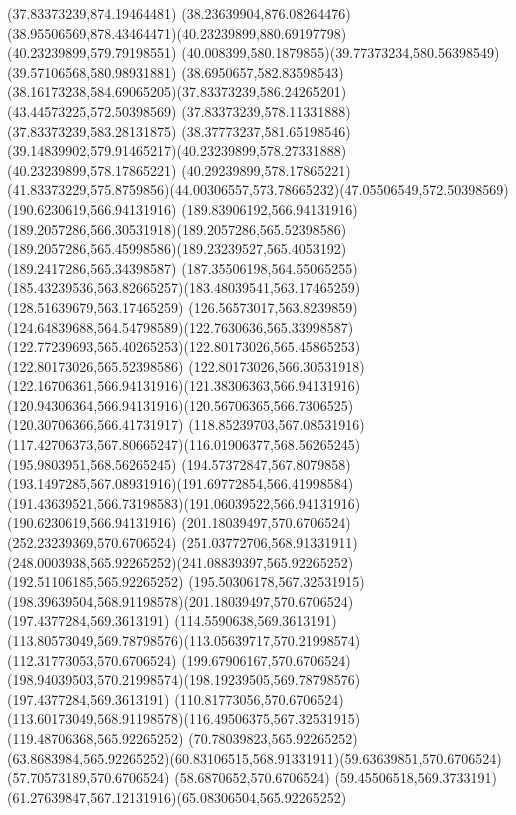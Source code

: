 {{\closepath
\moveto(37.83373239,874.19464481)
\curveto(38.23639904,876.08264476)(38.95506569,878.43464471)(40.23239899,880.69197798)
\lineto(40.23239899,579.79198551)
\curveto(40.008399,580.1879855)(39.77373234,580.56398549)(39.57106568,580.98931881)
\curveto(38.6950657,582.83598543)(38.16173238,584.69065205)(37.83373239,586.24265201)
\closepath
\moveto(43.44573225,572.50398569)
\lineto(37.83373239,578.11331888)
\lineto(37.83373239,583.28131875)
\curveto(38.37773237,581.65198546)(39.14839902,579.91465217)(40.23239899,578.27331888)
\lineto(40.23239899,578.17865221)
\lineto(40.29239899,578.17865221)
\curveto(41.83373229,575.8759856)(44.00306557,573.78665232)(47.05506549,572.50398569)
\closepath
\moveto(190.6230619,566.94131916)
\curveto(189.83906192,566.94131916)(189.2057286,566.30531918)(189.2057286,565.52398586)
\curveto(189.2057286,565.45998586)(189.23239527,565.4053192)(189.2417286,565.34398587)
\curveto(187.35506198,564.55065255)(185.43239536,563.82665257)(183.48039541,563.17465259)
\lineto(128.51639679,563.17465259)
\curveto(126.56573017,563.8239859)(124.64839688,564.54798589)(122.7630636,565.33998587)
\curveto(122.77239693,565.40265253)(122.80173026,565.45865253)(122.80173026,565.52398586)
\curveto(122.80173026,566.30531918)(122.16706361,566.94131916)(121.38306363,566.94131916)
\curveto(120.94306364,566.94131916)(120.56706365,566.7306525)(120.30706366,566.41731917)
\curveto(118.85239703,567.08531916)(117.42706373,567.80665247)(116.01906377,568.56265245)
\lineto(195.9803951,568.56265245)
\curveto(194.57372847,567.8079858)(193.1497285,567.08931916)(191.69772854,566.41998584)
\curveto(191.43639521,566.73198583)(191.06039522,566.94131916)(190.6230619,566.94131916)
\moveto(201.18039497,570.6706524)
\lineto(252.23239369,570.6706524)
\curveto(251.03772706,568.91331911)(248.0003938,565.92265252)(241.08839397,565.92265252)
\lineto(192.51106185,565.92265252)
\curveto(195.50306178,567.32531915)(198.39639504,568.91198578)(201.18039497,570.6706524)
\moveto(197.4377284,569.3613191)
\lineto(114.5590638,569.3613191)
\curveto(113.80573049,569.78798576)(113.05639717,570.21998574)(112.31773053,570.6706524)
\lineto(199.67906167,570.6706524)
\curveto(198.94039503,570.21998574)(198.19239505,569.78798576)(197.4377284,569.3613191)
\moveto(110.81773056,570.6706524)
\curveto(113.60173049,568.91198578)(116.49506375,567.32531915)(119.48706368,565.92265252)
\lineto(70.78039823,565.92265252)
\curveto(63.8683984,565.92265252)(60.83106515,568.91331911)(59.63639851,570.6706524)
\closepath
\moveto(57.70573189,570.6706524)
\lineto(58.6870652,570.6706524)
\curveto(59.45506518,569.3733191)(61.27639847,567.12131916)(65.08306504,565.92265252)
}}
